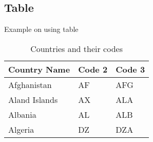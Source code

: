   \subsection{Table}

    \begin{frame}{Example on using table}

        \begin{table}[]
            \centering
            \caption{\label{tab:1}Countries and their codes}

            \renewcommand{\arraystretch}{1.5}
            \setlength{\tabcolsep}{10pt}

            {
                \begin{tabular}{ p{3cm}p{3cm}p{3cm}  }
                    \toprule
                    \textbf{Country Name} & \textbf{Code 2} & \textbf{Code 3} \\
                    \midrule
                    Afghanistan           & AF              & AFG             \\
                    Aland Islands         & AX              & ALA             \\
                    Albania               & AL              & ALB             \\
                    Algeria               & DZ              & DZA             \\
                    \bottomrule
                \end{tabular}
            }
        \end{table}

    \end{frame}